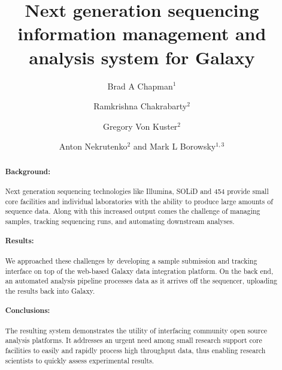\documentclass[10pt]{bmc_article}
\newenvironment{bmcformat}{\begin{raggedright}\baselineskip20pt\sloppy\setboolean{publ}{false}}{\end{raggedright}\baselineskip20pt\sloppy}
\begin{document}
\begin{bmcformat}


\title{Next generation sequencing information management and analysis
  system for Galaxy}

\author{Brad A Chapman\correspondingauthor$^{1}$%
      \and
        Ramkrishna Chakrabarty$^2$%
      \and
        Gregory Von Kuster$^2$%
      \and
        Anton Nekrutenko$^2$%
      and
         Mark L Borowsky$^{1,3}$%
      }

\address{%
    \iid(1)Department of Molecular Biology, Simches Research Center,%
    Massachusetts General Hospital, Boston, MA 02114, USA
    \iid(2)Huck Institute for the Life Sciences,%
    Penn State University, University Park, PA 16803, USA
    \iid(3)Department of Genetics,%
    Harvard Medical School, Boston, MA, USA
}%

\maketitle

\begin{abstract}
  \paragraph*{Background:} Next generation sequencing technologies
  like Illumina, SOLiD and 454 provide small core facilities and
  individual laboratories with the ability to produce large amounts of sequence
  data. Along with this increased output comes the challenge of
  managing samples, tracking sequencing runs, and automating downstream
  analyses.
  \paragraph*{Results:} We approached these challenges by developing a
  sample submission and tracking interface on top of the web-based
  Galaxy data integration platform. On the back end, an automated
  analysis pipeline processes data as it arrives off the sequencer,
  uploading the results back into Galaxy.
  \paragraph*{Conclusions:} The resulting system demonstrates the
  utility of interfacing community open source analysis platforms.
  It addresses an urgent need among small research support core
  facilities to easily and rapidly process high throughput data, thus
  enabling research scientists to quickly assess experimental
  results.
\end{abstract}


\end{bmcformat}
\end{document}

